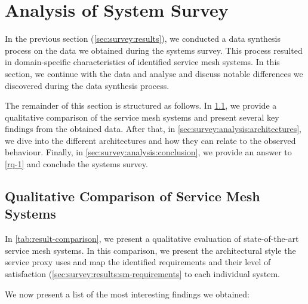 \section{Analysis of System Survey}
\label{sec:survey:analysis}


In the previous section (\cref{sec:survey:results}), we conducted a data synthesis process on the data we obtained during the systems survey. This process resulted in domain-specific characteristics of identified service mesh systems. In this section, we continue with the data and analyse and discuss notable differences we discovered during the data synthesis process.

The remainder of this section is structured as follows. In \cref{sec:survey:analysis:sm-framework}, we provide a qualitative comparison of the service mesh systems and present several key findings from the obtained data. After that, in \cref{sec:survey:analysis:architectures}, we dive into the different architectures and how they can relate to the observed behaviour. Finally, in \cref{sec:survey:analysis:conclusion}, we provide an answer to \ref{rq-1} and conclude the systems survey.


\subsection{Qualitative Comparison of Service Mesh Systems}
\label{sec:survey:analysis:sm-framework}

In \cref{tab:result-comparison}, we present a qualitative evaluation of state-of-the-art service mesh systems. In this comparison, we present the architectural style the service proxy uses and map the identified requirements and their level of satisfaction (\cref{sec:survey:results:sm-requirements} to each individual system. 



We now present a list of the most interesting findings we obtained:

